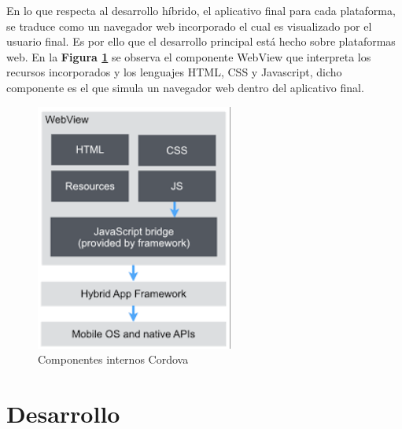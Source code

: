 \documentclass{IEEEtran}
\begin{document}
			En lo que respecta al desarrollo híbrido, el aplicativo final para cada plataforma, se traduce como un navegador web incorporado el cual es visualizado por el usuario final. Es por ello que el desarrollo principal está hecho sobre plataformas web. En la \textbf{Figura \ref{ionic-angular-cordova-webview}} se observa el componente WebView que interpreta los recursos incorporados y los lenguajes HTML, CSS y Javascript, dicho componente es el que simula un navegador web dentro del aplicativo final.

			\begin{figure}
				\centering
				\includegraphics[width=0.6\linewidth]{ionic-angular-cordova-webview}
				\caption{Componentes internos Cordova}
				\label{ionic-angular-cordova-webview}
			\end{figure}
			



	\section{Desarrollo}
		
\end{document}
